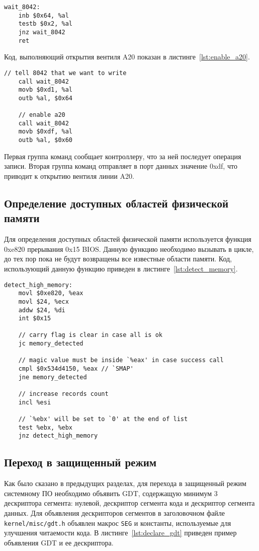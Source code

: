 \begin{lstlisting}[language={[x86masm]Assembler},
caption={Ожидание готовности контроллера 8042},label={lst:wait_8042}]
wait_8042:
	inb $0x64, %al
	testb $0x2, %al
	jnz wait_8042
	ret
\end{lstlisting}

Код, выполняющий открытия вентиля A20 показан в листинге~\ref{lst:enable_a20}.

\begin{lstlisting}[language={[x86masm]Assembler},
caption={Открытие вентиля линии A20},label={lst:enable_a20}]
	// tell 8042 that we want to write
	call wait_8042
	movb $0xd1, %al
	outb %al, $0x64

	// enable a20
	call wait_8042
	movb $0xdf, %al
	outb %al, $0x60
\end{lstlisting}

Первая группа команд сообщает контроллеру, что за ней последует операция записи.
Вторая группа команд отправляет в порт данных значение 0xdf, что приводит к открытию
вентиля линии A20.

\subsection{Определение доступных областей физической памяти}
Для определения доступных областей физической памяти используется функция 0xe820 прерывания 0x15 BIOS.
Данную функцию необходимо вызывать в цикле, до тех пор пока не будут возвращены все известные области
памяти. Код, использующий данную функцию приведен в листинге~\ref{lst:detect_memory}.

\begin{lstlisting}[language={[x86masm]Assembler},
caption={Определение доступных областей физической памяти},label={lst:detect_memory}]
detect_high_memory:
	movl $0xe820, %eax
	movl $24, %ecx
	addw $24, %di
	int $0x15

	// carry flag is clear in case all is ok
	jc memory_detected

	// magic value must be inside `%eax' in case success call
	cmpl $0x534d4150, %eax // `SMAP'
	jne memory_detected

	// increase records count
	incl %esi

	// `%ebx' will be set to `0' at the end of list
	test %ebx, %ebx
	jnz detect_high_memory
\end{lstlisting}


\subsection{Переход в защищенный режим}
Как было сказано в предыдущих разделах, для перехода в защищенный режим системному ПО
необходимо объявить GDT, содержащую минимум 3 дескриптора сегмента: нулевой, дескриптор сегмента
кода и дескриптор сегмента данных. Для объявления дескрипторов сегментов в заголовочном файле
\texttt{kernel/misc/gdt.h} объявлен макрос \texttt{SEG} и константы, используемые для улучшения
читаемости кода. В листинге~\ref{lst:declare_gdt} приведен пример объявления GDT и ее дескриптора.

